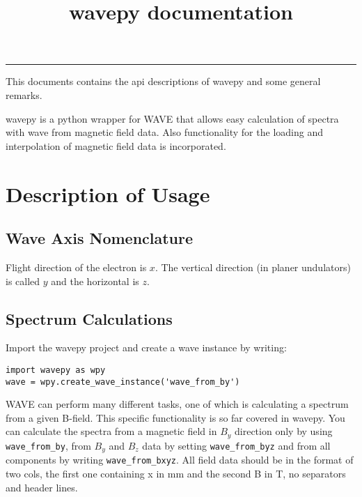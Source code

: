 \documentclass[
12pt,%
a4paper,  %
twoside        %
]{report}
\title{wavepy documentation}
\begin{document}
\etocsettocstyle{%
    \noindent\rule{\linewidth}{.4pt}
    \vspace*{-4\baselineskip}
    \section*{}
}
{%
    \noindent\rule{\linewidth}{.4pt}
    \vspace*{2\baselineskip}
}

\maketitle

\localtableofcontents

\clearpage

This documents contains the api descriptions of wavepy and some general remarks. 

wavepy is a python wrapper for WAVE that allows easy calculation of spectra with wave from magnetic field data. Also functionality for the loading and interpolation of magnetic field data is incorporated.

\chapter{Description of Usage}

\section{Wave Axis Nomenclature}

Flight direction of the electron is $x$. The vertical direction (in planer undulators) is called $y$ and the horizontal is $z$.

\section{Spectrum Calculations}

Import the wavepy project and create a wave instance by writing:
\begin{verbatim}
import wavepy as wpy
wave = wpy.create_wave_instance('wave_from_by')
\end{verbatim}
WAVE can perform many different tasks, one of which is calculating a spectrum from a given B-field. This specific functionality is so far covered in wavepy. You can calculate the spectra from a magnetic field in $B_y$ direction only by using \verb+wave_from_by+, from $B_y$ and $B_z$ data by setting \verb+wave_from_byz+ and from all components by writing \verb+wave_from_bxyz+. All field data should be in the format of two cols, the first one containing x in mm and the second B in T, no separators and header lines.
\end{document}
